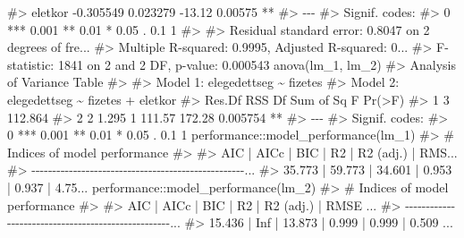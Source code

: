 \documentclass[
  letterpaper,
]{krantz}
\makeatletter
\newenvironment{Shaded}{\begin{snugshade}}{\end{snugshade}}
\newcommand{\CommentTok}[1]{\textcolor[rgb]{0.37,0.37,0.37}{#1}}
\newcommand{\FunctionTok}[1]{\textcolor[rgb]{0.28,0.35,0.67}{#1}}
\newcommand{\NormalTok}[1]{\textcolor[rgb]{0.00,0.23,0.31}{#1}}
\newcommand{\SpecialCharTok}[1]{\textcolor[rgb]{0.37,0.37,0.37}{#1}}
\newenvironment{kframe}{%
\medskip{}
\setlength{\fboxsep}{.8em}
 \def\at@end@of@kframe{}%
 \ifinner\ifhmode%
  \def\at@end@of@kframe{\end{minipage}}%
  \begin{minipage}{\columnwidth}%
 \fi\fi%
 \def\FrameCommand##1{\hskip\@totalleftmargin \hskip-\fboxsep
 \colorbox{shadecolor}{##1}\hskip-\fboxsep
     \hskip-\linewidth \hskip-\@totalleftmargin \hskip\columnwidth}%
 \MakeFramed {\advance\hsize-\width
   \@totalleftmargin\z@ \linewidth\hsize
   \@setminipage}}%
 {\par\unskip\endMakeFramed%
 \at@end@of@kframe}
\renewenvironment{Shaded}{\begin{kframe}}{\end{kframe}}
\makeatother
\begin{document}
\begin{Shaded}
\begin{Highlighting}[]
\CommentTok{\#\textgreater{} eletkor     {-}0.305549   0.023279  {-}13.12  0.00575 ** }
\CommentTok{\#\textgreater{} {-}{-}{-}}
\CommentTok{\#\textgreater{} Signif. codes:  }
\CommentTok{\#\textgreater{} 0 \textquotesingle{}***\textquotesingle{} 0.001 \textquotesingle{}**\textquotesingle{} 0.01 \textquotesingle{}*\textquotesingle{} 0.05 \textquotesingle{}.\textquotesingle{} 0.1 \textquotesingle{} \textquotesingle{} 1}
\CommentTok{\#\textgreater{} }
\CommentTok{\#\textgreater{} Residual standard error: 0.8047 on 2 degrees of fre...}
\CommentTok{\#\textgreater{} Multiple R{-}squared:  0.9995, Adjusted R{-}squared:  0...}
\CommentTok{\#\textgreater{} F{-}statistic:  1841 on 2 and 2 DF,  p{-}value: 0.000543}
\FunctionTok{anova}\NormalTok{(lm\_1, lm\_2)}
\CommentTok{\#\textgreater{} Analysis of Variance Table}
\CommentTok{\#\textgreater{} }
\CommentTok{\#\textgreater{} Model 1: elegedettseg \textasciitilde{} fizetes}
\CommentTok{\#\textgreater{} Model 2: elegedettseg \textasciitilde{} fizetes + eletkor}
\CommentTok{\#\textgreater{}   Res.Df     RSS Df Sum of Sq      F   Pr(\textgreater{}F)   }
\CommentTok{\#\textgreater{} 1      3 112.864                                }
\CommentTok{\#\textgreater{} 2      2   1.295  1    111.57 172.28 0.005754 **}
\CommentTok{\#\textgreater{} {-}{-}{-}}
\CommentTok{\#\textgreater{} Signif. codes:  }
\CommentTok{\#\textgreater{} 0 \textquotesingle{}***\textquotesingle{} 0.001 \textquotesingle{}**\textquotesingle{} 0.01 \textquotesingle{}*\textquotesingle{} 0.05 \textquotesingle{}.\textquotesingle{} 0.1 \textquotesingle{} \textquotesingle{} 1}
\NormalTok{performance}\SpecialCharTok{::}\FunctionTok{model\_performance}\NormalTok{(lm\_1)}
\CommentTok{\#\textgreater{} \# Indices of model performance}
\CommentTok{\#\textgreater{} }
\CommentTok{\#\textgreater{} AIC    |   AICc |    BIC |    R2 | R2 (adj.) |  RMS...}
\CommentTok{\#\textgreater{} {-}{-}{-}{-}{-}{-}{-}{-}{-}{-}{-}{-}{-}{-}{-}{-}{-}{-}{-}{-}{-}{-}{-}{-}{-}{-}{-}{-}{-}{-}{-}{-}{-}{-}{-}{-}{-}{-}{-}{-}{-}{-}{-}{-}{-}{-}{-}{-}{-}{-}{-}...}
\CommentTok{\#\textgreater{} 35.773 | 59.773 | 34.601 | 0.953 |     0.937 | 4.75...}
\NormalTok{performance}\SpecialCharTok{::}\FunctionTok{model\_performance}\NormalTok{(lm\_2)}
\CommentTok{\#\textgreater{} \# Indices of model performance}
\CommentTok{\#\textgreater{} }
\CommentTok{\#\textgreater{} AIC    | AICc |    BIC |    R2 | R2 (adj.) |  RMSE ...}
\CommentTok{\#\textgreater{} {-}{-}{-}{-}{-}{-}{-}{-}{-}{-}{-}{-}{-}{-}{-}{-}{-}{-}{-}{-}{-}{-}{-}{-}{-}{-}{-}{-}{-}{-}{-}{-}{-}{-}{-}{-}{-}{-}{-}{-}{-}{-}{-}{-}{-}{-}{-}{-}{-}{-}{-}...}
\CommentTok{\#\textgreater{} 15.436 |  Inf | 13.873 | 0.999 |     0.999 | 0.509 ...}
\end{Highlighting}
\end{Shaded}
\end{document}
